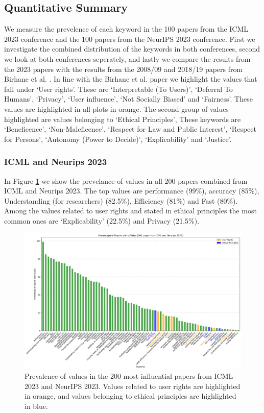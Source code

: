 \documentclass{article}
\begin{document}
\subsection{Quantitative Summary}
We measure the prevelence of each keyword in the 100 papers from the ICML 2023 conference and the 100 papers from the NeurIPS 2023 conference. First we investigate the combined distribution of the keywords in both conferences, second we look at both conferences seperately,
and lastly we compare the results from the 2023 papers with the results from the 2008/09 and 2018/19 papers from Birhane et al. \cite{valuesInML2021}. 
In line with the Birhane et al. paper we highlight the values that fall under `User rights'. These are `Interpretable (To Users)', `Deferral To Humans', `Privacy', `User influence', `Not Socially Biased' and `Fairness'. 
These values are highlighted in all plots in orange. The second group of values highlighted are values belonging to `Ethical Principles', These keywords are `Beneficence', `Non-Maleficence', `Respect for Law and Public Interest', 
`Respect for Persons', `Autonomy (Power to Decide)', `Explicability' and `Justice'.
\subsubsection{ICML and Neurips 2023}
In Figure \ref{fig:percentage_both_conferences} we show the prevelance of values in all 200 papers combined from ICML and Neurips 2023. The top values are performance (99\%), accuracy (85\%), 
Understanding (for researchers) (82.5\%), Efficiency (81\%) and Fast (80\%). Among the values related to user rights and stated in 
ethical principles the most common ones are `Explicability' (22.5\%) and Privacy (21.5\%). 

\begin{figure}[H]
    \centering
    \includegraphics[width=\textwidth]{../plots/percentage_both_conferences.png}
    \caption{Prevalence of values in the 200 most influential papers from ICML 2023 and NeurIPS 2023. Values related to user rights are highlighted in orange, and values belonging to ethical principles are highlighted in blue.}
    \label{fig:percentage_both_conferences}
\end{figure}
\end{document}
